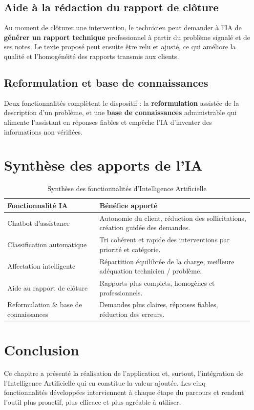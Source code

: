 \subsection{Aide à la rédaction du rapport de clôture}
Au moment de clôturer une intervention, le technicien peut demander à l'IA de \textbf{générer un rapport technique} professionnel à partir du problème signalé et de ses notes. Le texte proposé peut ensuite être relu et ajusté, ce qui améliore la qualité et l'homogénéité des rapports transmis aux clients.

\subsection{Reformulation et base de connaissances}
Deux fonctionnalités complètent le dispositif : la \textbf{reformulation} assistée de la description d'un problème, et une \textbf{base de connaissances} administrable qui alimente l'assistant en réponses fiables et empêche l'IA d'inventer des informations non vérifiées.

\section{Synthèse des apports de l'IA}
\begin{table}[H]
\centering
\caption{Synthèse des fonctionnalités d'Intelligence Artificielle}
\begin{tabularx}{\textwidth}{l X}
\toprule
\textbf{Fonctionnalité IA} & \textbf{Bénéfice apporté} \\
\midrule
Chatbot d'assistance & Autonomie du client, réduction des sollicitations, création guidée des demandes. \\
Classification automatique & Tri cohérent et rapide des interventions par priorité et catégorie. \\
Affectation intelligente & Répartition équilibrée de la charge, meilleure adéquation technicien / problème. \\
Aide au rapport de clôture & Rapports plus complets, homogènes et professionnels. \\
Reformulation \& base de connaissances & Demandes plus claires, réponses fiables, réduction des erreurs. \\
\bottomrule
\end{tabularx}
\label{tab:synthese-ia}
\end{table}

\section{Conclusion}
Ce chapitre a présenté la réalisation de l'application et, surtout, l'intégration de l'Intelligence Artificielle qui en constitue la valeur ajoutée. Les cinq fonctionnalités développées interviennent à chaque étape du parcours et rendent l'outil plus proactif, plus efficace et plus agréable à utiliser.


